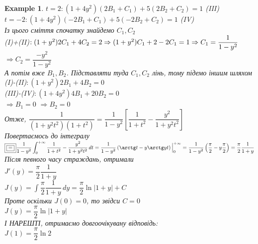 \documentclass[a4paper, 14pt]{extarticle}
\def\huge{\displaystyle}
\def\bigline{\vspace{5mm}\\}
\theoremstyle{theoremdd}
\theoremstyle{theoremdd}
\theoremstyle{theoremdd}
\theoremstyle{theoremdd}
\newtheorem{example}[theorem]{Example}
\theoremstyle{theoremdd}
\theoremstyle{theoremdd}
\theoremstyle{theoremdd}
\theoremstyle{theoremdd}
\begin{document}
\begin{example}
$t = 2: (1+4y^2)(2B_1+C_1) + 5(2B_2+C_2) = 1$ (III)\\
$t = -2: (1+4y^2)(-2B_1+C_1) + 5(-2B_2+C_2) = 1$ (IV)\\
Із цього сміття спочатку знайдемо $C_1,C_2$\\
(I)+(II)$: (1+y^2)2C_1 + 4C_2 = 2 \Rightarrow (1+y^2)C_1 + 2 - 2C_1 = 1 \\ \Rightarrow C_1 = \dfrac{1}{1-y^2}$ \hspace{1cm}
$\Rightarrow C_2 = \dfrac{-y^2}{1-y^2}$\\
А потім вже $B_1,B_2$. Підставляти туда $C_1,C_2$ лінь, тому підемо іншим шляхом\\
(I)-(II)$: (1+y^2)2B_1 + 4B_2 = 0$\\
(III)-(IV)$: (1+4y^2)4B_1 + 20B_2 = 0$\\
$\Rightarrow B_1 = 0$ \hspace{1cm} $\Rightarrow B_2 = 0$\\
Отже, $\dfrac{1}{(1+y^2t^2)(1+t^2)} = \dfrac{1}{1-y^2} \left[ \dfrac{1}{1+t^2} - \dfrac{y^2}{1+y^2t^2} \right]$\\
Повертаємось до інтегралу\\
$\boxed{\boxed{=}} \dfrac{1}{1-y^2} \huge\int_0^{+\infty} \dfrac{1}{1+t^2} - \dfrac{y^2}{1+y^2t^2} \,dt = \dfrac{1}{1-y^2} \left( \arctg t - y \arctg yt \right) \Big|_{0}^{+\infty} = \dfrac{1}{1-y^2} \left( \dfrac{\pi}{2} - y \dfrac{\pi}{2} \right) = \dfrac{\pi}{2} \dfrac{1}{1+y}$\\
Після певного часу страждань, отримали\\
$J'(y) = \dfrac{\pi}{2} \dfrac{1}{1+y}$\\
$J(y) = \huge\int \dfrac{\pi}{2} \dfrac{1}{1+y} \,dy = \dfrac{\pi}{2} \ln|1+y| + C$\\
Проте оскільки $J(0) = 0$, то звідси $C = 0$\\
$J(y) = \dfrac{\pi}{2} \ln |1+y|$\\
І НАРЕШТІ, отримаємо довгоочікувану відповідь:\\
$J(1) = \dfrac{\pi}{2} \ln 2$
\bigline
\end{example}
\end{document}
